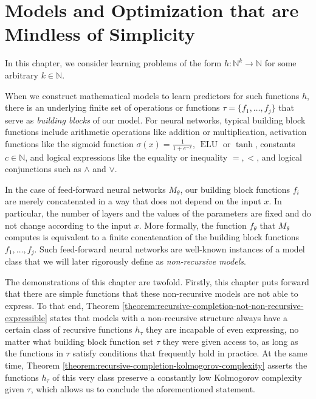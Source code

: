 
\chapter{Models and Optimization that are Mindless of Simplicity}
\label{chap:models-optimization-kolmogorov}
In this chapter, we consider learning problems of the form $h:\mathbb{N}^k\to\mathbb{N}$ for some arbitrary $k\in\mathbb{N}$. 

When we construct mathematical models to learn predictors for such functions $h$, there is an underlying finite set of operations or functions $\tau=\{f_1,\dots,f_j\}$ that serve as \textit{building blocks} of our model.
For neural networks, typical building block functions include arithmetic operations like addition or multiplication, activation functions like the sigmoid function $\sigma(x)=\frac{1}{1+e^{-x}}$, $\operatorname{ELU}$ or $\tanh$, constants $c\in\mathbb{N}$, and logical expressions like the equality or inequality $=,<$, and logical conjunctions such as $\land$ and $\lor$.

In the case of feed-forward neural networks $M_\theta$, our building block functions $f_i$ are merely concatenated in a way that does not depend on the input $x$.
In particular, the number of layers and the values of the parameters are fixed and do not change according to the input $x$.
More formally, the function $f_{\theta}$ that $M_\theta$ computes is equivalent to a finite concatenation of the building block functions $f_1,\dots,f_j$.
Such feed-forward neural networks are well-known instances of a model class that we will later rigorously define as \textit{non-recursive models}.

The demonstrations of this chapter are twofold.
Firstly, this chapter puts forward that there are simple functions that these non-recursive models are not able to express.
To that end, Theorem \ref{theorem:recursive-completion-not-non-recursive-expressible} states that models with a non-recursive structure always have a certain class of recursive functions $h_{\tau}$ they are incapable of even expressing, no matter what building block function set $\tau$ they were given access to, as long as the functions in $\tau$ satisfy conditions that frequently hold in practice. 
At the same time, Theorem \ref{theorem:recursive-completion-kolmogorov-complexity} asserts the functions $h_{\tau}$ of this very class preserve a constantly low Kolmogorov complexity given $\tau$, which allows us to conclude the aforementioned statement.

